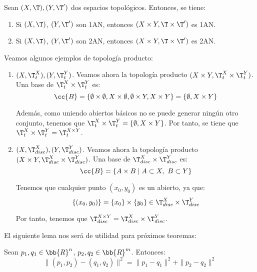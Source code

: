 \begin{coro}
    Sean $(X,\T), (Y,\T')$ dos espacios topológicos. Entonces, se tiene:
    \begin{enumerate}
        \item Si $(X,\T)$, $(Y,\T')$ son 1AN, entonces $(X\times Y, \T\times \T')$ es 1AN.
        \item Si $(X,\T)$, $(Y,\T')$ son 2AN, entonces $(X\times Y, \T\times \T')$ es 2AN.
    \end{enumerate}
\end{coro}

\begin{ejemplo} Veamos algunos ejemplos de topología producto:
    \begin{enumerate}
        \item $(X,\T_t^X), (Y,\T_t^Y)$. Veamos ahora la topología producto $(X\times Y, \T_t^X\times \T_t^Y)$. Una base de $\T_t^X\times \T_t^Y$ es:
        \begin{equation*}
            \cc{B}=\{\emptyset\times \emptyset, X\times \emptyset, \emptyset\times Y, X\times Y\}=\{\emptyset, X\times Y\}
        \end{equation*}

        Además, como uniendo abiertos básicos no se puede generar ningún otro conjunto, tenemos que $\T_t^X\times \T^Y_t=\{\emptyset, X\times Y\}$. Por tanto, se tiene que $\T_t^X\times \T_t^Y=\T_t^{X\times Y}$.

        \item $(X,\T_{disc}^X), (Y,\T_{disc}^Y)$. Veamos ahora la topología producto $(X\times Y, \T_{disc}^X\times \T_{disc}^Y)$. Una base de $\T_{disc}^X\times \T_{disc}^Y$ es:
        \begin{equation*}
            \cc{B}=\{A\times B\mid A\subset X,~B\subset Y\}
        \end{equation*}
        
        Tenemos que cualquier punto $(x_0,y_0)$  es un abierto, ya que:
        \begin{equation*}
            \{(x_0,y_0)\} = \{x_0\}\times \{y_0\}\in \T_{disc}^X\times \T_{disc}^Y
        \end{equation*}

        Por tanto, tenemos que $\T_{disc}^{X\times Y}=\T_{disc}^X\times \T_{disc}^Y$.
    \end{enumerate}
\end{ejemplo}


El siguiente lema nos será de utilidad para próximos teoremas:
\begin{lema}
    Sean $p_1,q_1\in \bb{R}^n$, $p_2,q_2\in \bb{R}^m$. Entonces:
    \begin{equation*}
        \|(p_1,p_2) - (q_1, q_2)\|^2 = \|p_1-q_1\|^2 + \|p_2-q_2\|^2
    \end{equation*}
\end{lema}

